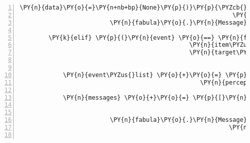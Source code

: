 \begin{Verbatim}[commandchars=\\\{\},numbers=left,firstnumber=1,stepnumber=1]
                                                                                       \PY{n}{data}\PY{o}{=}\PY{n+nb+bp}{None}\PY{p}{)}\PY{p}{\PYZcb{}}\PY{p}{)}\PY{p}{,}
                                                           \PY{n}{room}\PY{o}{.}\PY{n}{entity\PYZus{}locations}\PY{p}{[}\PY{l+s}{\PYZsq{}}\PY{l+s}{sign}\PY{l+s}{\PYZsq{}}\PY{p}{]} \PY{o}{+} \PY{p}{(}\PY{n}{room}\PY{o}{.}\PY{n}{identifier}\PY{p}{,}\PY{p}{)}\PY{p}{)}\PY{p}{]}\PY{p}{)}\PY{p}{,}
                         \PY{n}{fabula}\PY{o}{.}\PY{n}{Message}\PY{p}{(}\PY{p}{[}\PY{n}{fabula}\PY{o}{.}\PY{n}{DeleteEvent}\PY{p}{(}\PY{n}{identifier}\PY{o}{=}\PY{l+s}{\PYZsq{}}\PY{l+s}{sign}\PY{l+s}{\PYZsq{}}\PY{p}{)}\PY{p}{]}\PY{p}{)}\PY{p}{]}

        \PY{k}{elif} \PY{p}{(}\PY{n}{event} \PY{o}{==} \PY{n}{fabula}\PY{o}{.}\PY{n}{TriesToDropEvent}\PY{p}{(}\PY{n}{identifier}\PY{o}{=}\PY{n}{ID\PYZus{}CASSANDRA}\PY{p}{,}
                                               \PY{n}{item\PYZus{}identifier}\PY{o}{=}\PY{l+s}{\PYZsq{}}\PY{l+s}{cobweb}\PY{l+s}{\PYZsq{}}\PY{p}{,}
                                               \PY{n}{target\PYZus{}identifier}\PY{o}{=}\PY{n}{ID\PYZus{}KUNI}\PY{p}{)}\PY{p}{)}\PY{p}{:}


            \PY{n}{event\PYZus{}list} \PY{o}{+}\PY{o}{=} \PY{p}{[}\PY{n}{fabula}\PY{o}{.}\PY{n}{PerceptionEvent}\PY{p}{(}\PY{n}{identifier}\PY{o}{=}\PY{n}{ID\PYZus{}CASSANDRA}\PY{p}{,}
                                                  \PY{n}{perception}\PY{o}{=}\PY{l+s}{\PYZsq{}}\PY{l+s}{Kuni guckt irritiert.}\PY{l+s}{\PYZsq{}}\PY{p}{)}\PY{p}{]}

            \PY{n}{messages} \PY{o}{+}\PY{o}{=} \PY{p}{[}\PY{n}{fabula}\PY{o}{.}\PY{n}{Message}\PY{p}{(}\PY{p}{[}\PY{n}{fabula}\PY{o}{.}\PY{n}{PerceptionEvent}\PY{p}{(}\PY{n}{identifier}\PY{o}{=}\PY{n}{ID\PYZus{}KUNI}\PY{p}{,}
                                                                \PY{n}{perception}\PY{o}{=}\PY{l+s}{\PYZsq{}}\PY{l+s}{Cassandra kommt dir mit Spinnweben }\PY{l+s}{\PYZsq{}}
                                                                           \PY{l+s}{\PYZsq{}}\PY{l+s}{gefährlich nah.}\PY{l+s}{\PYZsq{}}\PY{p}{)}\PY{p}{]}\PY{p}{)}\PY{p}{,}
                         \PY{n}{fabula}\PY{o}{.}\PY{n}{Message}\PY{p}{(}\PY{p}{[}\PY{n}{fabula}\PY{o}{.}\PY{n}{SaysEvent}\PY{p}{(}\PY{n}{identifier}\PY{o}{=}\PY{n}{ID\PYZus{}KUNI}\PY{p}{,}
                                                          \PY{n}{text}\PY{o}{=}\PY{l+s}{\PYZsq{}}\PY{l+s}{Ihh, was machst du? Das ist klebrig!}\PY{l+s}{\PYZsq{}}\PY{p}{)}\PY{p}{]}\PY{p}{)}\PY{p}{]}


\end{Verbatim}
